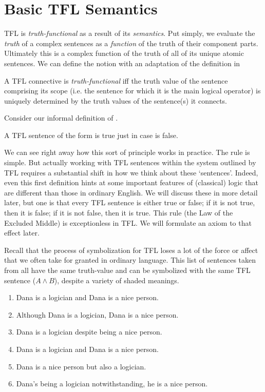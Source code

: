 
\section{Basic TFL Semantics}

TFL is \emph{truth-functional} as a result of its \emph{semantics}. Put simply,
we evaluate the \emph{truth} of a complex sentences as a \emph{function} of the
truth of their component parts. Ultimately this is a complex function of the
truth of all of its unique atomic sentences. We can define the notion with an
adaptation of the definition in \cite[][p. 72]{Mag25}

\begin{definition}
  \label{def:truth-functional}
  A TFL connective is \emph{truth-functional} iff the truth value of the
  sentence comprising its scope (i.e. the sentence for which it is the main
  logical operator) is uniquely determined by the truth values of the
  sentence(s) it connects.
\end{definition}

Consider our informal definition of \enot\ephi.

\begin{argument}
\item[] A TFL sentence of the form \enot\ephi is true just in case \ephi is false. 
\end{argument}

We can see right away how this sort of principle works in practice. The rule is
simple. But actually working with TFL sentences within the system outlined by TFL
requires a substantial shift in how we think about these `sentences'. Indeed, even
this first definition hints at some important features of (classical) logic that
are different than those in ordinary English. We will discuss these in more detail
later, but one is that every TFL sentence is either true or false; if it is not
true, then it is false; if it is not false, then it is true. This rule (the Law of
the Excluded Middle) is exceptionless in TFL. We will formulate an axiom to that
effect later.

Recall that the process of symbolization for TFL loses a lot of the force or
affect that we often take for granted in ordinary language. This list of sentences
taken from \cite[][p. 73]{Mag25} all have the same truth-value and can be
symbolized with the same TFL sentence ($A \wedge B$), despite a variety of shaded
meanings.

\begin{enumerate}
  \item Dana is a logician and Dana is a nice person.
  \item Although Dana is a logician, Dana is a nice person.
  \item Dana is a logician despite being a nice person.
  \item Dana is a logician and Dana is a nice person.
  \item Dana is a nice person but also a logician. 
  \item Dana's being a logician notwithstanding, he is a nice person.
\end{enumerate}

